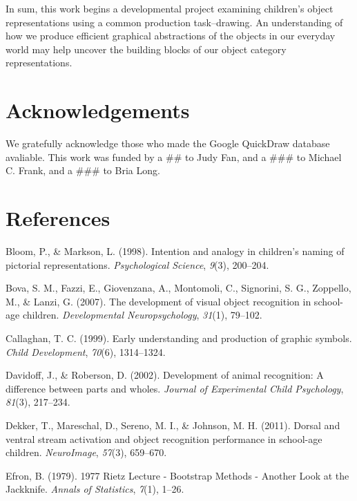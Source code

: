 \documentclass[10pt, letterpaper]{article}
\begin{document}
In sum, this work begins a developmental project examining children's
object representations using a common production task--drawing. An
understanding of how we produce efficient graphical abstractions of the
objects in our everyday world may help uncover the building blocks of
our object category representations.

\section{Acknowledgements}\label{acknowledgements}

We gratefully acknowledge those who made the Google QuickDraw database
avaliable. This work was funded by a \#\# to Judy Fan, and a \#\#\# to
Michael C. Frank, and a \#\#\# to Bria Long.

\section{References}\label{references}

\setlength{\parindent}{-0.1in} \setlength{\leftskip}{0.125in} \noindent

\hypertarget{refs}{}
\hypertarget{ref-bloom1998intention}{}
Bloom, P., \& Markson, L. (1998). Intention and analogy in children's
naming of pictorial representations. \emph{Psychological Science},
\emph{9}(3), 200--204.

\hypertarget{ref-bova2007}{}
Bova, S. M., Fazzi, E., Giovenzana, A., Montomoli, C., Signorini, S. G.,
Zoppello, M., \& Lanzi, G. (2007). The development of visual object
recognition in school-age children. \emph{Developmental
Neuropsychology}, \emph{31}(1), 79--102.

\hypertarget{ref-callaghan1999early}{}
Callaghan, T. C. (1999). Early understanding and production of graphic
symbols. \emph{Child Development}, \emph{70}(6), 1314--1324.

\hypertarget{ref-davidoff2002}{}
Davidoff, J., \& Roberson, D. (2002). Development of animal recognition:
A difference between parts and wholes. \emph{Journal of Experimental
Child Psychology}, \emph{81}(3), 217--234.

\hypertarget{ref-dekker2011dorsal}{}
Dekker, T., Mareschal, D., Sereno, M. I., \& Johnson, M. H. (2011).
Dorsal and ventral stream activation and object recognition performance
in school-age children. \emph{NeuroImage}, \emph{57}(3), 659--670.

\hypertarget{ref-Efron:1979ts}{}
Efron, B. (1979). 1977 Rietz Lecture - Bootstrap Methods - Another Look
at the Jackknife. \emph{Annals of Statistics}, \emph{7}(1), 1--26.
\end{document}
